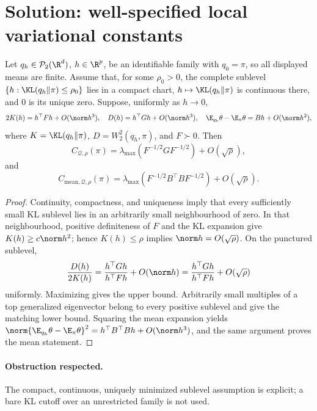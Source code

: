 \documentclass[../main.tex]{subfiles}
\begin{document}

\section*{Solution: well-specified local variational constants}

\begin{theorem}
Let $q_h\in\mathcal P_2(\R^d)$, $h\in\R^p$, be an identifiable family with $q_0=\pi$, so all
displayed means are finite. Assume that, for some $\rho_0>0$, the complete sublevel
$\{h:\KL(q_h\|\pi)\le\rho_0\}$ lies in a compact chart,
$h\mapsto\KL(q_h\|\pi)$ is continuous there, and $0$ is its unique zero. Suppose, uniformly
as $h\to0$,
\[
 2K(h)=h^\top Fh+O(\norm h^3),\quad
 D(h)=h^\top Gh+O(\norm h^3),\quad
 \E_{q_h}\theta-\E_\pi\theta=Bh+O(\norm h^2),
\]
where $K=\KL(q_h\|\pi)$, $D=W_2^2(q_h,\pi)$, and $F\succ0$. Then
\[
 C_{\mathcal Q,\rho}(\pi)
 =\lambda_{\max}(F^{-1/2}GF^{-1/2})+O(\sqrt\rho),
\]
and
\[
 C_{\mathrm{mean},\mathcal Q,\rho}(\pi)
 =\lambda_{\max}(F^{-1/2}B^\top BF^{-1/2})+O(\sqrt\rho).
\]
\end{theorem}

\begin{proof}
Continuity, compactness, and uniqueness imply that every sufficiently small KL sublevel lies in
an arbitrarily small neighbourhood of zero. In that neighbourhood, positive definiteness of
$F$ and the KL expansion give $K(h)\ge c\norm h^2$; hence $K(h)\le\rho$ implies
$\norm h=O(\sqrt\rho)$. On the punctured sublevel,
\[
 \frac{D(h)}{2K(h)}
 =\frac{h^\top Gh}{h^\top Fh}+O(\norm h)
 =\frac{h^\top Gh}{h^\top Fh}+O(\sqrt\rho)
\]
uniformly. Maximizing gives the upper bound. Arbitrarily small multiples of a top generalized
eigenvector belong to every positive sublevel and give the matching lower bound. Squaring the
mean expansion yields
$\norm{\E_{q_h}\theta-\E_\pi\theta}^2=h^\top B^\top Bh+O(\norm h^3)$, and the same argument
proves the mean statement.
\end{proof}

\paragraph{Obstruction respected.}
The compact, continuous, uniquely minimized sublevel assumption is explicit; a bare KL cutoff
over an unrestricted family is not used.
\end{document}
